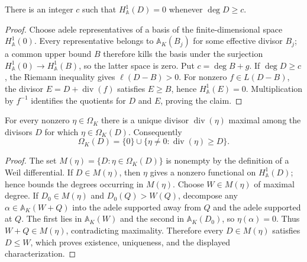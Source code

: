 \begin{theorem}
  \label{thm:adelic_index_eventually_zero}
  \notready
  There is an integer \(c\) such that
  \(H^1_{\mathbb A}(D)=0\) whenever \(\deg D\ge c\).
\end{theorem}
\begin{proof}
  Choose adele representatives of a basis of the finite-dimensional space
  \(H^1_{\mathbb A}(0)\).  Every representative belongs to
  \(\mathbb A_K(B_j)\) for some effective divisor \(B_j\); a common upper
  bound \(B\) therefore kills the basis under the surjection
  \(H^1_{\mathbb A}(0)\to H^1_{\mathbb A}(B)\), so the latter space is zero.
  Put \(c=\deg B+g\).  If \(\deg D\ge c\), the Riemann inequality gives
  \(\ell(D-B)>0\).  For nonzero \(f\in L(D-B)\), the divisor
  \(E=D+\operatorname{div}(f)\) satisfies \(E\ge B\), hence
  \(H^1_{\mathbb A}(E)=0\).  Multiplication by \(f^{-1}\) identifies the
  quotients for \(D\) and \(E\), proving the claim.
\end{proof}

\begin{theorem}
  \label{thm:adelic_weil_differential_divisor}
  \notready
  For every nonzero \(\eta\in\Omega_K\) there is a unique divisor
  \(\operatorname{div}(\eta)\) maximal among the divisors \(D\) for which
  \(\eta\in\Omega_K(D)\).  Consequently
  \[
    \Omega_K(D)=\{0\}\cup
      \{\eta\ne0:\operatorname{div}(\eta)\ge D\}.
  \]
\end{theorem}
\begin{proof}
  The set \(M(\eta)=\{D:\eta\in\Omega_K(D)\}\) is nonempty by the
  definition of a Weil differential.  If \(D\in M(\eta)\), then \(\eta\)
  gives a nonzero functional on \(H^1_{\mathbb A}(D)\); hence
   bounds the degrees occurring in
  \(M(\eta)\).  Choose \(W\in M(\eta)\) of maximal degree.  If
  \(D_0\in M(\eta)\) and \(D_0(Q)>W(Q)\), decompose any
  \(\alpha\in\mathbb A_K(W+Q)\) into the adele supported away from \(Q\)
  and the adele supported at \(Q\).  The first lies in \(\mathbb A_K(W)\)
  and the second in \(\mathbb A_K(D_0)\), so \(\eta(\alpha)=0\).  Thus
  \(W+Q\in M(\eta)\), contradicting maximality.  Therefore every
  \(D\in M(\eta)\) satisfies \(D\le W\), which proves existence,
  uniqueness, and the displayed characterization.
\end{proof}

